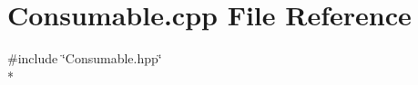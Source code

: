 \section{Consumable.\-cpp File Reference}
\label{_consumable_8cpp}
{\ttfamily \#include \char`\"{}Consumable.\-hpp\char`\"{}}\\*
